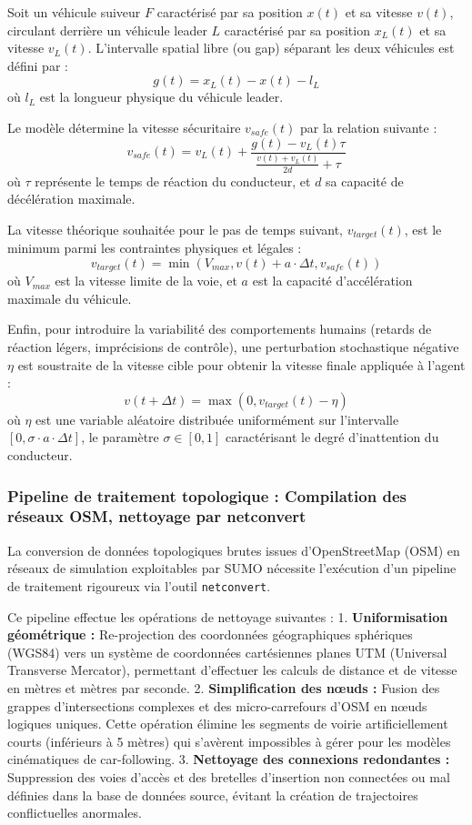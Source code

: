 \documentclass[11pt, a4paper]{article}
\begin{document}
Soit un véhicule suiveur \(F\) caractérisé par sa position \(x(t)\) et
sa vitesse \(v(t)\), circulant derrière un véhicule leader \(L\)
caractérisé par sa position \(x_L(t)\) et sa vitesse \(v_L(t)\).
L'intervalle spatial libre (ou gap) séparant les deux véhicules est
défini par : \[g(t) = x_L(t) - x(t) - l_L\] où \(l_L\) est la longueur
physique du véhicule leader.

Le modèle détermine la vitesse sécuritaire \(v_{safe}(t)\) par la
relation suivante :
\[v_{safe}(t) = v_L(t) + \frac{g(t) - v_L(t)\tau}{\frac{v(t) + v_L(t)}{2d} + \tau}\]
où \(\tau\) représente le temps de réaction du conducteur, et \(d\) sa
capacité de décélération maximale.

La vitesse théorique souhaitée pour le pas de temps suivant,
\(v_{target}(t)\), est le minimum parmi les contraintes physiques et
légales :
\[v_{target}(t) = \min\left( V_{max}, v(t) + a \cdot \Delta t, v_{safe}(t) \right)\]
où \(V_{max}\) est la vitesse limite de la voie, et \(a\) est la
capacité d'accélération maximale du véhicule.

Enfin, pour introduire la variabilité des comportements humains (retards
de réaction légers, imprécisions de contrôle), une perturbation
stochastique négative \(\eta\) est soustraite de la vitesse cible pour
obtenir la vitesse finale appliquée à l'agent :
\[v(t + \Delta t) = \max\left( 0, v_{target}(t) - \eta \right)\] où
\(\eta\) est une variable aléatoire distribuée uniformément sur
l'intervalle \([0, \sigma \cdot a \cdot \Delta t]\), le paramètre
\(\sigma \in [0, 1]\) caractérisant le degré d'inattention du
conducteur.

\subsubsection{Pipeline de traitement topologique : Compilation des
réseaux OSM, nettoyage par
netconvert}\label{pipeline-de-traitement-topologique-compilation-des-ruxe9seaux-osm-nettoyage-par-netconvert}

La conversion de données topologiques brutes issues d'OpenStreetMap
(OSM) en réseaux de simulation exploitables par SUMO nécessite
l'exécution d'un pipeline de traitement rigoureux via l'outil
\texttt{netconvert}.

Ce pipeline effectue les opérations de nettoyage suivantes : 1.
\textbf{Uniformisation géométrique :} Re-projection des coordonnées
géographiques sphériques (WGS84) vers un système de coordonnées
cartésiennes planes UTM (Universal Transverse Mercator), permettant
d'effectuer les calculs de distance et de vitesse en mètres et mètres
par seconde. 2. \textbf{Simplification des nœuds :} Fusion des grappes
d'intersections complexes et des micro-carrefours d'OSM en nœuds
logiques uniques. Cette opération élimine les segments de voirie
artificiellement courts (inférieurs à 5 mètres) qui s'avèrent
impossibles à gérer pour les modèles cinématiques de car-following. 3.
\textbf{Nettoyage des connexions redondantes :} Suppression des voies
d'accès et des bretelles d'insertion non connectées ou mal définies dans
la base de données source, évitant la création de trajectoires
conflictuelles anormales.
\end{document}
